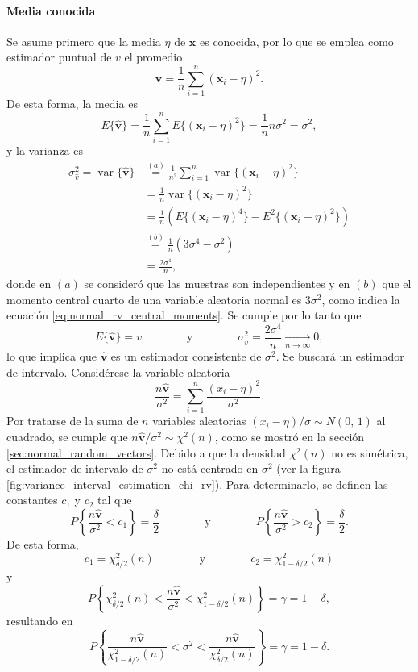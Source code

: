 \documentclass[a4paper]{report}
\newcommand{\vbf}{\mathbf{v}}
\newcommand{\x}{\mathbf{x}}
\newcommand{\var}{\operatorname{var}}
\begin{document}
\paragraph{Media conocida} Se asume primero que la media \(\eta\) de \(\x\) es conocida, por lo que se emplea como estimador puntual de \(v\) el promedio
\[
 \hat{\vbf}=\frac{1}{n}\sum_{i=1}^n(\x_i-\eta)^2.
\]
De esta forma, la media es
\[
 E\{\hat{\vbf}\}=\frac{1}{n}\sum_{i=1}^nE\{(\x_i-\eta)^2\}=\frac{1}{n}n\sigma^2=\sigma^2,
\]
y la varianza es
\begin{align*}
 \sigma_{\hat{v}}^2=\var\{\hat{\vbf}\}&\overset{(a)}{=}\frac{1}{n^2}\sum_{i=1}^n\var\{(\x_i-\eta)^2\}\\
   &=\frac{1}{n}\var\{(\x_i-\eta)^2\}\\
   &=\frac{1}{n}\left(E\{(\x_i-\eta)^4\}-E^2\{(\x_i-\eta)^2\}\right)\\
   &\overset{(b)}{=}\frac{1}{n}(3\sigma^4-\sigma^2)\\
   &=\frac{2\sigma^4}{n},
\end{align*}
donde en \((a)\) se consideró que las muestras son independientes y en \((b)\) que el momento central cuarto de una variable aleatoria normal es \(3\sigma^2\), como indica la ecuación \ref{eq:normal_rv_central_moments}. Se cumple por lo tanto que
\[
 E\{\hat{\vbf}\}=v\qquad\qquad\textrm{y}\qquad\qquad\sigma^2_{\hat{v}}=\frac{2\sigma^4}{n}\xrightarrow[n\to\infty]{}0,
\]
lo que implica que \(\hat{\vbf}\) es un estimador consistente de \(\sigma^2\). Se buscará un estimador de intervalo. Considérese la variable aleatoria
\[
 \frac{n\hat{\vbf}}{\sigma^2}=\sum_{i=1}^n\frac{(x_i-\eta)^2}{\sigma^2}.
\]
Por tratarse de la suma de \(n\) variables aleatorias \((x_i-\eta)/\sigma\sim N(0,\,1)\) al cuadrado, se cumple que \(n\hat{\vbf}/\sigma^2\sim\chi^2(n)\), como se mostró en la sección \ref{sec:normal_random_vectors}. Debido a que la densidad \(\chi^2(n)\) no es simétrica, el estimador de intervalo de \(\sigma^2\) no está centrado en \(\sigma^2\) (ver la figura \ref{fig:variance_interval_estimation_chi_rv}). Para determinarlo, se definen las constantes \(c_1\) y \(c_2\) tal que 
\[
 P\left\{\frac{n\hat{\vbf}}{\sigma^2}<c_1\right\}=\frac{\delta}{2}
  \qquad\qquad\textrm{y}\qquad\qquad
 P\left\{\frac{n\hat{\vbf}}{\sigma^2}>c_2\right\}=\frac{\delta}{2}. 
\]
De esta forma, 
\[
 c_1=\chi^2_{\delta/2}(n)\qquad\qquad\textrm{y}\qquad\qquad
 c_2=\chi^2_{1-\delta/2}(n)
\]
y
\[
 P\left\{\chi^2_{\delta/2}(n)<\frac{n\hat{\vbf}}{\sigma^2}<\chi^2_{1-\delta/2}(n)\right\}=\gamma=1-\delta,
\]
resultando en
\[
 P\left\{\frac{n\hat{\vbf}}{\chi^2_{1-\delta/2}(n)}<\sigma^2<\frac{n\hat{\vbf}}{\chi^2_{\delta/2}(n)}\right\}=\gamma=1-\delta.
\]
\end{document}
